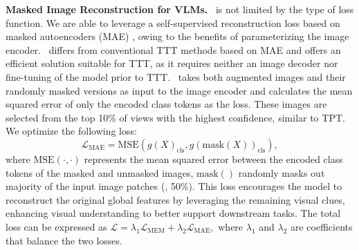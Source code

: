 \noindent\textbf{Masked Image Reconstruction for VLMs.}\hspace{5mm}
\name\ is not limited by the type of loss function.
We are able to leverage a self-supervised reconstruction loss based on masked autoencoders (MAE) \citep{he2022masked, gandelsman2022test}, owing to the benefits of parameterizing the image encoder.
\name\ differs from conventional TTT methods based on MAE \citep{gandelsman2022test,wang2023test} and offers an efficient solution suitable for TTT, as it requires neither an image decoder nor fine-tuning of the model prior to TTT.
\name\ takes both augmented images and their randomly masked versions as input to the image encoder and calculates the mean squared error of only the encoded class tokens as the loss. These images are selected from the top 10\% of views with the highest confidence, similar to TPT.
We optimize the following loss:
\begin{equation}
\mathcal{L}_{\text{MAE}} = \text{MSE}(g(X)_{\text{cls}}, g(\text{mask}(X))_{\text{cls}}),
\end{equation}
where $\text{MSE}(\cdot, \cdot)$ represents the mean squared error between the encoded class tokens of the masked and unmasked images, $\text{mask}()$ randomly masks out majority of the input image patches (\eg, 50\%). 
This loss encourages the model to reconstruct the original global features by leveraging the remaining visual clues, enhancing visual understanding to better support downstream tasks.
The total loss can be expressed as
$
\mathcal{L} = \lambda_1\mathcal{L}_{\text{MEM}} + \lambda_2\mathcal{L}_{\text{MAE}},
$ where $\lambda_1$ and $\lambda_2$ are coefficients that balance the two losses.